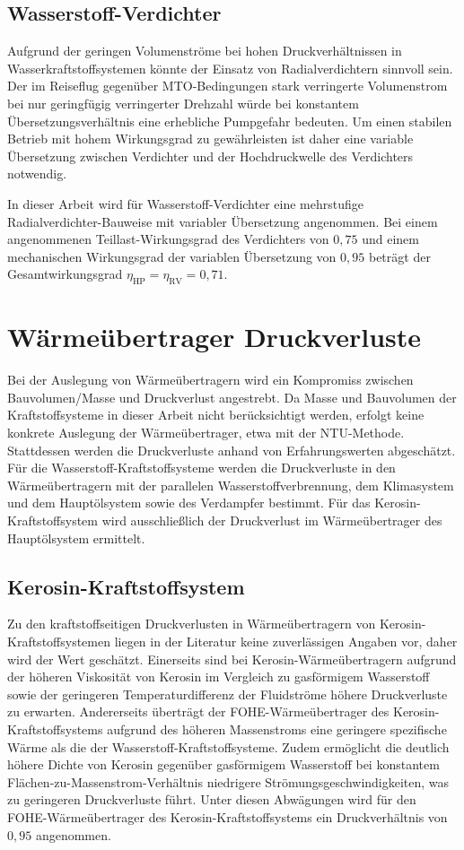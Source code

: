 \subsection{Wasserstoff-Verdichter}

Aufgrund der geringen Volumenströme bei hohen Druckverhältnissen in Wasserkraftstoffsystemen könnte der Einsatz von Radialverdichtern sinnvoll sein. Der im Reiseflug gegenüber MTO-Bedingungen stark verringerte Volumenstrom bei nur geringfügig verringerter Drehzahl würde bei konstantem Übersetzungsverhältnis eine erhebliche Pumpgefahr bedeuten. Um einen stabilen Betrieb mit hohem Wirkungsgrad zu gewährleisten ist daher eine variable Übersetzung zwischen Verdichter und der Hochdruckwelle des Verdichters notwendig. 

In dieser Arbeit wird für Wasserstoff-Verdichter eine mehrstufige Radialverdichter-Bauweise mit variabler Übersetzung angenommen. Bei einem angenommenen Teillast-Wirkungsgrad des Verdichters von $0,75$ und einem mechanischen Wirkungsgrad der variablen Übersetzung von $0,95$ beträgt der Gesamtwirkungsgrad $\eta_{\mathrm{HP}}=\eta_\mathrm{RV}=0,71$.

\section{Wärmeübertrager Druckverluste}

Bei der Auslegung von Wärmeübertragern wird ein Kompromiss zwischen Bauvolumen/Masse und Druckverlust angestrebt. Da Masse und Bauvolumen der Kraftstoffsysteme in dieser Arbeit nicht berücksichtigt werden, erfolgt keine konkrete Auslegung der Wärmeübertrager, etwa mit der NTU-Methode. Stattdessen werden die Druckverluste anhand von Erfahrungswerten abgeschätzt. Für die Wasserstoff-Kraftstoffsysteme werden die Druckverluste in den Wärmeübertragern mit der parallelen Wasserstoffverbrennung, dem Klimasystem und dem Hauptölsystem sowie des Verdampfer bestimmt. Für das Kerosin-Kraftstoffsystem wird ausschließlich der Druckverlust im Wärmeübertrager des Hauptölsystem ermittelt.

\subsection{Kerosin-Kraftstoffsystem}

Zu den kraftstoffseitigen Druckverlusten in Wärmeübertragern von Kerosin-Kraftstoffsystemen liegen in der Literatur keine zuverlässigen Angaben vor, daher wird der Wert geschätzt. Einerseits sind bei Kerosin-Wärmeübertragern aufgrund der höheren Viskosität von Kerosin im Vergleich zu gasförmigem Wasserstoff sowie der geringeren Temperaturdifferenz der Fluidströme höhere Druckverluste zu erwarten. Andererseits überträgt der FOHE-Wärmeübertrager des Kerosin-Kraftstoffsystems aufgrund des höheren Massenstroms eine geringere spezifische Wärme als die der Wasserstoff-Kraftstoffsysteme. Zudem ermöglicht die deutlich höhere Dichte von Kerosin gegenüber gasförmigem Wasserstoff bei konstantem Flächen-zu-Massenstrom-Verhältnis niedrigere Strömungsgeschwindigkeiten, was zu geringeren Druckverluste führt. Unter diesen Abwägungen wird für den FOHE-Wärmeübertrager des Kerosin-Kraftstoffsystems ein Druckverhältnis von $0,95$ angenommen.


